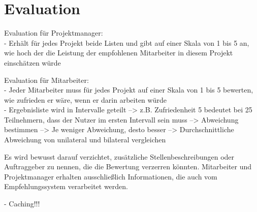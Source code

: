 \newpage
\section{Evaluation}
\label{ch:methodik:evaluation}
Evaluation für Projektmanager:\\
- Erhält für jedes Projekt beide Listen und gibt auf einer Skala von 1 bis 5 an, wie hoch der die Leistung der empfohlenen Mitarbeiter in diesem Projekt einschätzen würde

Evaluation für Mitarbeiter:\\
- Jeder Mitarbeiter muss für jedes Projekt auf einer Skala von 1 bis 5 bewerten, wie zufrieden er wäre, wenn er darin arbeiten würde\\
- Ergebnisliste wird in Intervalle geteilt --> z.B. Zufriedenheit 5 bedeutet bei 25 Teilnehmern, dass der Nutzer im ersten Intervall sein muss --> Abweichung bestimmen --> Je weniger Abweichung, desto besser --> Durchschnittliche Abweichung von unilateral und bilateral vergleichen

Es wird bewusst darauf verzichtet, zusätzliche Stellenbeschreibungen oder Auftraggeber zu nennen, die die Bewertung verzerren könnten. Mitarbeiter und Projektmanager erhalten ausschließlich Informationen, die auch vom Empfehlungssystem verarbeitet werden.

- Caching!!!
